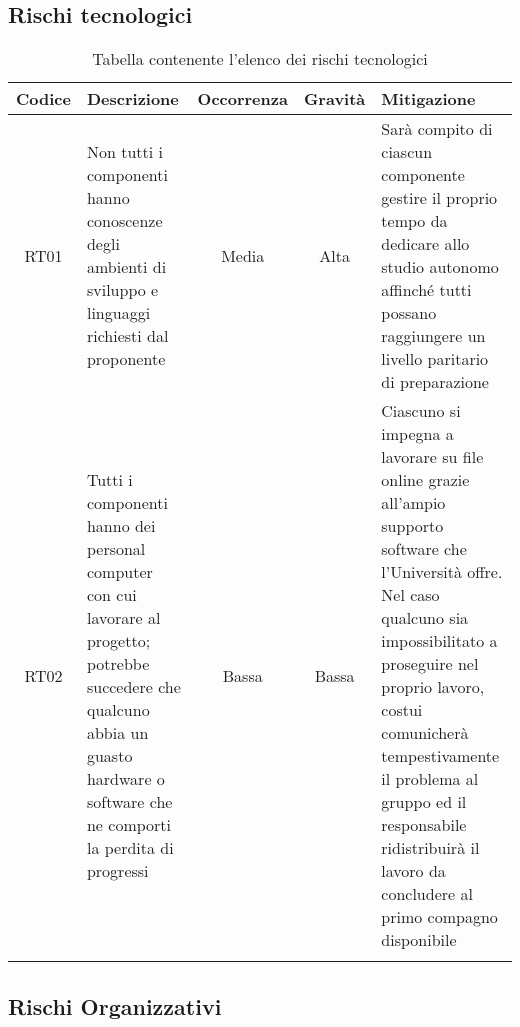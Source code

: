 \documentclass[../piano_di_progetto.tex]{subfiles}
\begin{document}
\newpage

\subsection{Rischi tecnologici}%
\label{sub:rischi_tec}

\begin{center}
	\begin{longtable}{|c|p{4.5cm}|c|c|p{4.5cm}|}
		\hline
		\rowcolor{lightgray}
		{\textbf{Codice}} & {\textbf{Descrizione}} & {\textbf{Occorrenza}} & {\textbf{Gravità}} & {\textbf{Mitigazione}}                                                                                                                                                                                                                \\

		\hline
		RT01              &
		Non tutti i componenti hanno conoscenze degli ambienti di sviluppo e linguaggi richiesti dal proponente
		                  &
		Media
		                  &
		Alta
		                  &
		Sarà compito di ciascun componente gestire il proprio tempo da dedicare allo studio autonomo affinché tutti possano raggiungere un livello paritario di preparazione                                                                                                                                                            \\
		RT02              &
		Tutti i componenti hanno dei personal computer con cui lavorare al progetto; potrebbe succedere che qualcuno abbia un guasto hardware o software che ne comporti la perdita di progressi
		                  &
		Bassa
		                  &
		Bassa
		                  &
		Ciascuno si impegna a lavorare su file online grazie all’ampio supporto software che l’Università offre. Nel caso qualcuno sia impossibilitato a proseguire nel proprio lavoro, costui comunicherà tempestivamente il problema al gruppo ed il responsabile ridistribuirà il lavoro da concludere al primo compagno disponibile \\
		\hline
		\rowcolor{white}
		\caption{Tabella contenente l'elenco dei rischi tecnologici}
	\end{longtable}
\end{center}

\subsection{Rischi Organizzativi}%
\label{sub:rischi_org}
\end{document}
